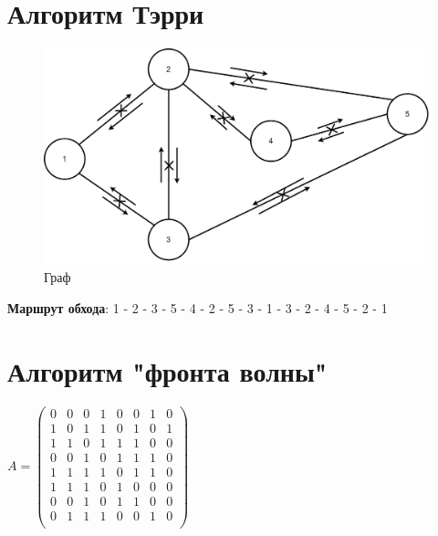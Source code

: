 \section{Алгоритм Тэрри}
\begin{figure}[!htb]
	\centering
	\includegraphics[width=\textwidth]{Images/graph1.jpg}
	\caption{Граф}
	\label{fig:image1}
\end{figure}
\textbf{Маршрут обхода}:
1 - 2 - 3 - 5 - 4 - 2 - 5 - 3 - 1 - 3 - 2 - 4 - 5 - 2 - 1
\newpage
\section{Алгоритм "фронта волны"}

$A = \begin{pmatrix}
0 & 0 & 0 & 1 & 0 & 0 & 1 & 0\\
1 & 0 & 1 & 1 & 0 & 1 & 0 & 1\\
1 & 1 & 0 & 1 & 1 & 1 & 0 & 0\\
0 & 0 & 1 & 0 & 1 & 1 & 1 & 0\\
1 & 1 & 1 & 1 & 0 & 1 & 1 & 0\\
1 & 1 & 1 & 0 & 1 & 0 & 0 & 0\\
0 & 0 & 1 & 0 & 1 & 1 & 0 & 0\\
0 & 1 & 1 & 1 & 0 & 0 & 1 & 0\\
\end{pmatrix}$

